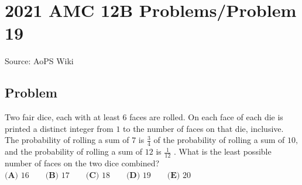 \documentclass[12pt]{article}
\begin{document}
\section*{{2021 AMC 12B Problems/Problem 19}}
Source: AoPS Wiki

\subsection*{Problem}
Two fair dice, each with at least $6$ faces are rolled. On each face of each die is printed a distinct integer from $1$ to the number of faces on that die, inclusive. The probability of rolling a sum of $7$ is $\frac34$ of the probability of rolling a sum of $10,$ and the probability of rolling a sum of $12$ is $\frac{1}{12}$ . What is the least possible number of faces on the two dice combined? $\textbf{(A) }16 \qquad \textbf{(B) }17 \qquad \textbf{(C) }18\qquad \textbf{(D) }19 \qquad \textbf{(E) }20$
\end{document}
